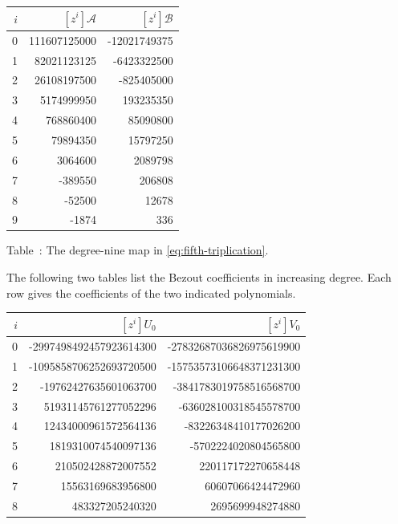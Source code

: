 \begin{center}
\small
{}\label{tab:fifth-map}
\begin{tabular}{r|r r}
$i$ & $[z^i]\mathcal A$ & $[z^i]\mathcal B$\\\hline
0 & 111607125000 & -12021749375\\
1 & 82021123125 & -6423322500\\
2 & 26108197500 & -825405000\\
3 & 5174999950 & 193235350\\
4 & 768860400 & 85090800\\
5 & 79894350 & 15797250\\
6 & 3064600 & 2089798\\
7 & -389550 & 206808\\
8 & -52500 & 12678\\
9 & -1874 & 336\\
\end{tabular}
\par\smallskip
Table~\thetable: The degree-nine map in \eqref{eq:fifth-triplication}.
\end{center}
\noindent The following two tables list the Bezout coefficients in increasing degree.
Each row gives the coefficients of the two indicated polynomials.
\begin{center}
\scriptsize
\begin{tabular}{r|r r}
$i$ & $[z^i]U_0$ & $[z^i]V_0$\\\hline
0 & -2997498492457923614300 & -27832687036826975619900\\
1 & -1095858706252693720500 & -15753573106648371231300\\
2 & -19762427635601063700 & -3841783019758516568700\\
3 & 51931145761277052296 & -636028100318545578700\\
4 & 12434000961572564136 & -83226348410177026200\\
5 & 1819310074540097136 & -5702224020804565800\\
6 & 210502428872007552 & 220117172270658448\\
7 & 15563169683956800 & 60607066424472960\\
8 & 483327205240320 & 2695699948274880\\
\end{tabular}
\end{center}
